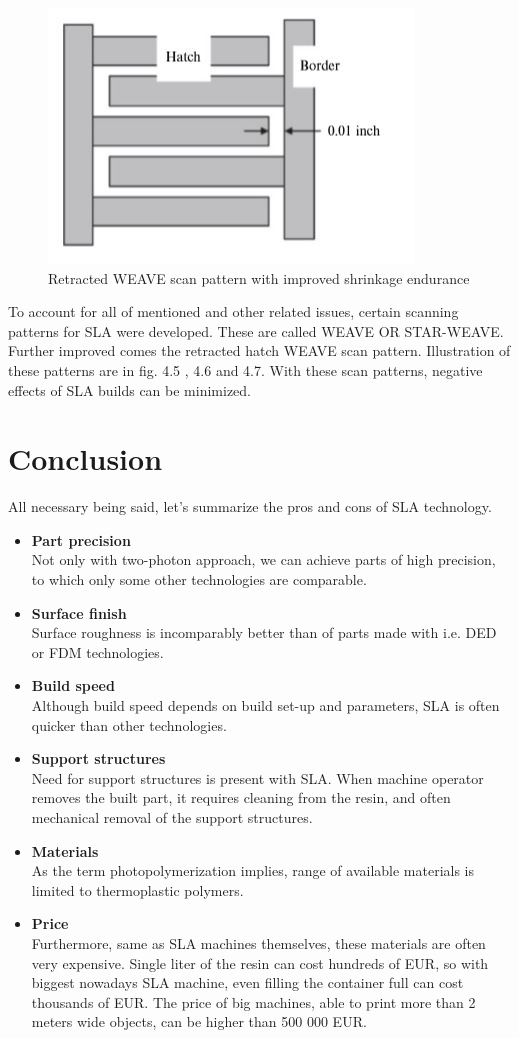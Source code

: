 \documentclass[a4paper, twoside, 11pt]{report}
\newcommand\pro{\item[$+$]}
\newcommand\con{\item[$-$]}
\begin{document}
\begin{figure}[h]
\begin{minipage}[t]{\textwidth}
  \centering
  \includegraphics[scale=0.8]{retractedWeave}
  \caption{Retracted WEAVE scan pattern with improved shrinkage endurance}
  \end{minipage}
\end{figure}
To account for all of mentioned and other related issues, certain scanning patterns for SLA were developed. These are called WEAVE OR STAR-WEAVE. Further improved comes the retracted hatch WEAVE scan pattern. Illustration of these patterns are in fig. 4.5 , 4.6 and 4.7. With these scan patterns, negative effects of SLA builds can be minimized.

%
\section{Conclusion}
All necessary being said, let's summarize the pros and cons of SLA technology.
\begin{itemize}
\pro \textbf{Part precision}\\
Not only with two-photon approach, we can achieve parts of high precision, to which only some other technologies are comparable.
\pro \textbf{Surface finish}\\
Surface roughness is incomparably better than of parts made with i.e. DED or FDM technologies.
\pro \textbf{Build speed}\\
Although build speed depends on build set-up and parameters, SLA is often quicker than other technologies.
\\[10pt]
\con \textbf{Support structures}\\
Need for support structures is present with SLA. When machine operator removes the built part, it requires cleaning from the resin, and often mechanical removal of the support structures.
\con \textbf{Materials}\\
As the term photopolymerization implies, range of available materials is limited to thermoplastic polymers.
\con \textbf{Price}\\
Furthermore, same as SLA machines themselves, these materials are often very expensive. Single liter of the resin can cost hundreds of EUR, so with biggest nowadays SLA machine, even filling the container full can cost thousands of EUR. The price of big machines, able to print more than 2 meters wide objects, can be higher than 500 000 EUR.
\end{itemize}
\tableofcontents
\listoftodos
\end{document}
